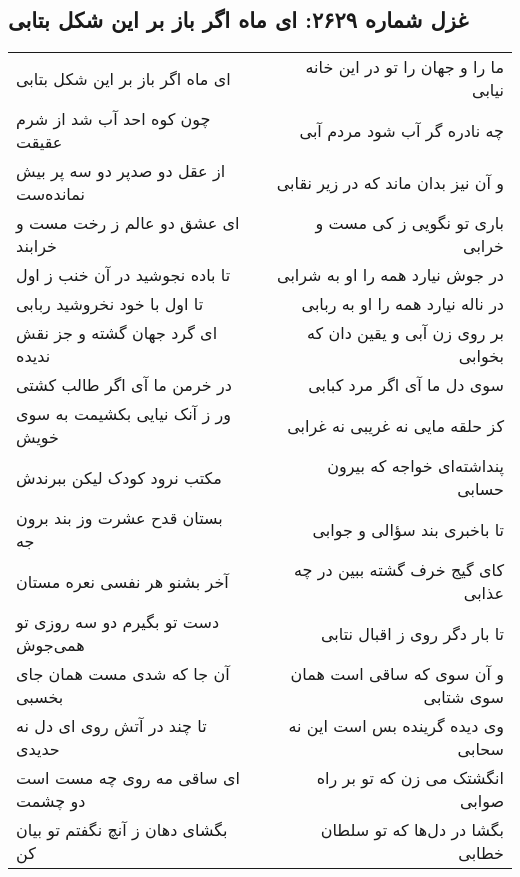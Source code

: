 \begin{center}
\section*{غزل شماره ۲۶۲۹: ای ماه اگر باز بر این شکل بتابی}
\label{sec:2629}
\begin{longtable}{l p{0.5cm} r}
ای ماه اگر باز بر این شکل بتابی
&&
ما را و جهان را تو در این خانه نیابی
\\
چون کوه احد آب شد از شرم عقیقت
&&
چه نادره گر آب شود مردم آبی
\\
از عقل دو صدپر دو سه پر بیش نمانده‌ست
&&
و آن نیز بدان ماند که در زیر نقابی
\\
ای عشق دو عالم ز رخت مست و خرابند
&&
باری تو نگویی ز کی مست و خرابی
\\
تا باده نجوشید در آن خنب ز اول
&&
در جوش نیارد همه را او به شرابی
\\
تا اول با خود نخروشید ربابی
&&
در ناله نیارد همه را او به ربابی
\\
ای گرد جهان گشته و جز نقش ندیده
&&
بر روی زن آبی و یقین دان که بخوابی
\\
در خرمن ما آی اگر طالب کشتی
&&
سوی دل ما آی اگر مرد کبابی
\\
ور ز آنک نیایی بکشیمت به سوی خویش
&&
کز حلقه مایی نه غریبی نه غرابی
\\
مکتب نرود کودک لیکن ببرندش
&&
پنداشته‌ای خواجه که بیرون حسابی
\\
بستان قدح عشرت وز بند برون جه
&&
تا باخبری بند سؤالی و جوابی
\\
آخر بشنو هر نفسی نعره مستان
&&
کای گیج خرف گشته ببین در چه عذابی
\\
دست تو بگیرم دو سه روزی تو همی‌جوش
&&
تا بار دگر روی ز اقبال نتابی
\\
آن جا که شدی مست همان جای بخسبی
&&
و آن سوی که ساقی است همان سوی شتابی
\\
تا چند در آتش روی ای دل نه حدیدی
&&
وی دیده گرینده بس است این نه سحابی
\\
ای ساقی مه روی چه مست است دو چشمت
&&
انگشتک می زن که تو بر راه صوابی
\\
بگشای دهان ز آنچ نگفتم تو بیان کن
&&
بگشا در دل‌ها که تو سلطان خطابی
\\
\end{longtable}
\end{center}
